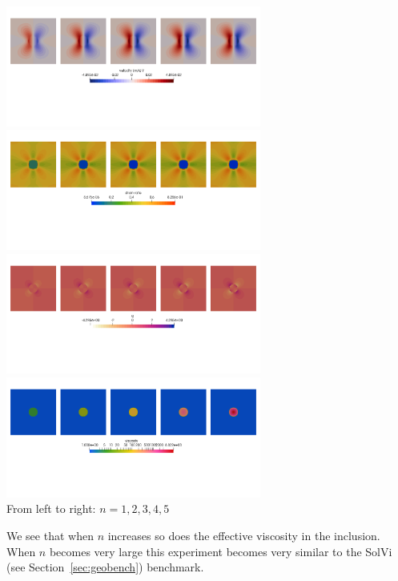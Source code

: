 \begin{center}
\includegraphics[width=8.4cm]{python_codes/fieldstone_87/results/experiment_05/v.png}
\includegraphics[width=8.4cm]{python_codes/fieldstone_87/results/experiment_05/sr.png}\\
\includegraphics[width=8.4cm]{python_codes/fieldstone_87/results/experiment_05/press.png}
\includegraphics[width=8.4cm]{python_codes/fieldstone_87/results/experiment_05/eta.png}\\
{\captionfont From left to right: $n=1,2,3,4,5$}
\end{center}

We see that when $n$ increases so does the effective viscosity in the inclusion. When 
$n$ becomes very large this experiment becomes very similar to the SolVi (see 
Section~\ref{sec:geobench}) benchmark.

